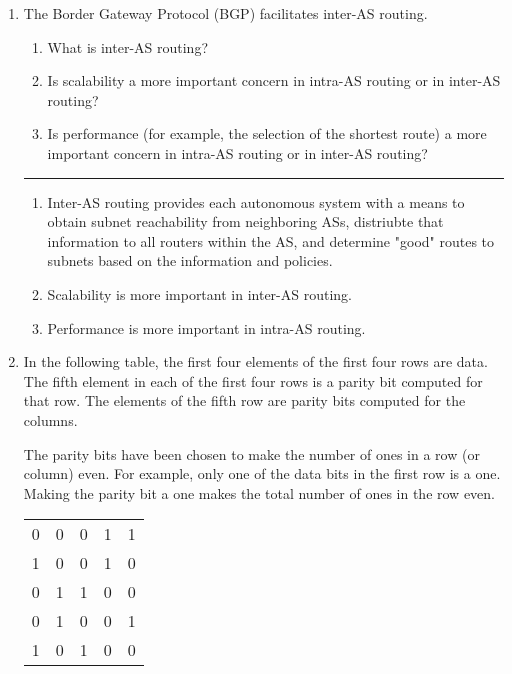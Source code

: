 \documentclass[twoside]{article}
\newenvironment{answer}
  {\vspace*{0.2cm} \rule{12cm}{0.04cm} \vspace*{0.2cm}}
  {\vspace*{0.2cm}}
\begin{document}
\begin{enumerate}
\begin{answer}
    \end{answer}

  \item The Border Gateway Protocol (BGP) facilitates inter-AS routing.
  \begin{enumerate}
    \item What is inter-AS routing?
    \item Is scalability a more important concern in intra-AS routing
      or in inter-AS routing?
    \item Is performance (for example, the selection of the shortest
      route) a more important concern in intra-AS routing or
      in inter-AS routing?
    \end{enumerate}

  \begin{answer}

  \begin{enumerate}
    \item Inter-AS routing provides each autonomous system with a means 
	to obtain subnet reachability from neighboring ASs, distriubte 
	that information to all routers within the AS, and determine 
	"good" routes to subnets based on the information and policies.
    \item Scalability is more important in inter-AS routing.
    \item Performance is more important in intra-AS routing.
    \end{enumerate}

    \end{answer}

  \item In the following table, the first four elements of the
    first four rows are data. The fifth element in each of the 
    first four rows is a parity bit computed for that row.
    The elements of the fifth row are parity bits computed
    for the columns.

    The parity bits have been chosen to make the number of
    ones in a row (or column) even.
    For example, only one of the data bits in the first row
    is a one. Making the parity bit a one makes the total
    number of ones in the row even.

  \begin{tabular}{llll|l}
    0 & 0 & 0 & 1 & 1 \\
    1 & 0 & 0 & 1 & 0 \\
    0 & 1 & 1 & 0 & 0 \\
    0 & 1 & 0 & 0 & 1 \\ \hline
    1 & 0 & 1 & 0 & 0
    \end{tabular}


\end{enumerate}
\end{document}
